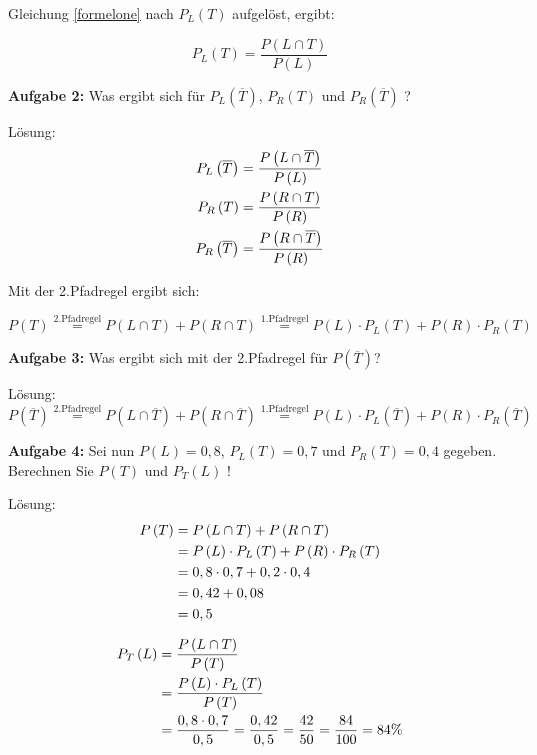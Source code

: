 \documentclass{article}
\begin{document}
\vspace{1cm}
Gleichung \eqref{formelone} nach $P_L\left(T\right)$ aufgel\"ost, ergibt:

$$ P_L\left(T\right) = \frac{P\left(L\cap T\right)}{P\left(L\right)}$$

\textbf{Aufgabe 2:} Was ergibt sich f\"ur $P_L\left(\overline{T}\right)$, $P_R\left(T\right)$ und $P_R\left(\overline{T}\right)$ ?

L\"osung:
\begin{align}
P_L\left(\overline{T}\right) &= \frac{P\left(L\cap \overline{T}\right)}{P\left(L\right)} \notag \\
P_R\left(T\right) &= \frac{P\left(R\cap T\right)}{P\left(R\right)} \notag \\
P_R\left(\overline{T}\right) &= \frac{P\left(R\cap \overline{T}\right)}{P\left(R\right)} \notag 
\end{align}

\vspace{1cm}
Mit der 2.Pfadregel ergibt sich:

$$P\left(T\right)\overset{\text{2.Pfadregel}}{=} P\left(L\cap T\right) + P\left(R\cap T\right) \overset{\text{1.Pfadregel}}{=} P\left(L\right) \cdot P_L\left(T\right) + P\left(R\right) \cdot P_R\left(T\right)$$

\textbf{Aufgabe 3:} Was ergibt sich mit der 2.Pfadregel f\"ur $P\left(\overline{T}\right)$?

L\"osung:
$$P\left(\overline{T}\right)\overset{\text{2.Pfadregel}}{=} P\left(L\cap \overline{T}\right) + P\left(R\cap \overline{T}\right) \overset{\text{1.Pfadregel}}{=} P\left(L\right) \cdot P_L\left(\overline{T}\right) + P\left(R\right) \cdot P_R\left(\overline{T}\right)$$

\vspace{1cm}

\textbf{Aufgabe 4:} Sei nun $P\left(L\right) = 0,8$, $P_L\left(T\right) = 0,7$ und $P_R\left(T\right) = 0,4$ gegeben.
Berechnen Sie $P\left(T\right)$ und $P_T\left(L\right)$ !

L\"osung:
\begin{align}
P\left(T\right) &= P\left(L\cap T\right) + P\left(R\cap T\right) \notag \\ &= P\left(L\right) \cdot P_L\left(T\right) + P\left(R\right) \cdot P_R\left(T\right) \notag \\ &= 0,8 \cdot 0,7 + 0,2 \cdot 0,4 \notag \\
&= 0,42 + 0,08 \notag \\
&= 0,5 \notag
\end{align}

\begin{align}
P_T\left(L\right) &= \frac{P\left(L \cap T\right)}{P\left(T\right)} \notag \\
&= \frac{P\left(L\right) \cdot P_L\left(T\right)}{P\left(T\right)} \notag \\
&= \frac{0,8 \cdot 0,7}{ 0,5 } = \frac{0,42}{0,5} = \frac{42}{50} = \frac{84}{100} = 84\% \notag
\end{align}
\end{document}
